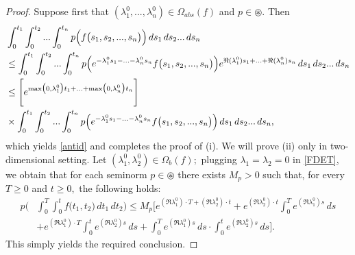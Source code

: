 \documentclass{amsart}
\theoremstyle{definition}
\theoremstyle{remark}
\numberwithin{equation}{section}
\begin{document}
\begin{proof}
Suppose first that $(\lambda_{1}^{0},...,\lambda_{n}^{0})\in \Omega_{abs}(f)$ and $p\in \circledast.$ Then 
\begin{align*} &
\int^{t_{1}}_{0}\int^{t_{2}}_{0}...\int^{t_{n}}_{0}p\Bigl( f\bigl( s_{1},s_{2},...,s_{n}\bigr)\Bigr)\, ds_{1} \, ds_{2}...\, ds_{n}
\\& \leq \int^{t_{1}}_{0}\int^{t_{2}}_{0}...\int^{t_{n}}_{0}p\Bigl( e^{-\lambda_{1}^{0}s_{1}-...-\lambda_{n}^{0}s_{n}}f\bigl( s_{1},s_{2},...,s_{n}\bigr)\Bigr)e^{\Re (\lambda_{1}^{0})s_{1}+...+\Re(\lambda_{n}^{0})s_{n}}\, ds_{1} \, ds_{2}...\, ds_{n} \\&
\leq \Biggl[ e^{\max \bigl(0,\lambda_{1}^{0}\bigr)t_{1}+...+\max \bigl(0,\lambda_{n}^{0}\bigr)t_{n}}\Biggr]
\\& \times \int^{t_{1}}_{0}\int^{t_{2}}_{0}...\int^{t_{n}}_{0}p\Bigl( e^{-\lambda_{1}^{0}s_{1}-...-\lambda_{n}^{0}s_{n}}f\bigl( s_{1},s_{2},...,s_{n}\bigr)\Bigr)\, ds_{1} \, ds_{2}...\, ds_{n},
\end{align*}
which yields \eqref{antid} and completes the proof of (i). We will prove (ii) only in two-dimensional setting. Let $(\lambda_{1}^{0},\lambda_{2}^{0})\in \Omega_{b}(f);$ plugging $\lambda_{1}=\lambda_{2}=0$ in \eqref{FDET}, we obtain that for each seminorm $p\in \circledast$ there exists $M_{p}>0$ such that, for every $T\geq 0$ and $t\geq 0,$ the following holds:
\begin{align*}
  p\Biggl(&\int^{T}_{0}\int^{t}_{0}f\bigl( t_{1},t_{2}\bigr)\, dt_{1}\, dt_{2}\Biggr)
 \leq M_{p}\Biggl[ e^{(\Re \lambda_{1}^{0})\cdot T+(\Re \lambda_{2}^{0})\cdot t}+e^{(\Re \lambda_{2}^{0})\cdot t} \int^{T}_{0}e^{(\Re \lambda_{1}^{0})s}\, ds\\&+e^{(\Re \lambda_{1}^{0})\cdot T} \int^{t}_{0}e^{(\Re \lambda_{2}^{0})s}\, ds+\int^{T}_{0}e^{(\Re \lambda_{1}^{0})s}\, ds \cdot  \int^{t}_{0}e^{(\Re \lambda_{2}^{0})s}\, ds\Biggr].
\end{align*}
This simply yields the required conclusion. 


\end{proof}
\end{document}
